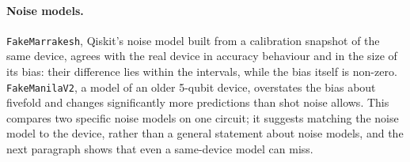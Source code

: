 \documentclass[11pt]{article}
\begin{document}
\begin{table}[h]
\centering
\small
{}
\caption{Hardware study, 200 inputs per task, 1{,}024 shots. ``Changed / expected'' counts predictions that differ from the noise-free prediction, against the exact shot-noise expectation; $p = P(\text{total} \ge \text{observed})$ under shot noise alone. Bias intervals are 95\% bootstraps over inputs (over runs and inputs for the three CVE runs); per-run values are in the text.}
\label{tab:hw}
\end{table}

\paragraph{Noise models.} \texttt{FakeMarrakesh}, Qiskit's noise model built from a calibration snapshot of the same device, agrees with the real device in accuracy behaviour and in the size of its bias: their difference lies within the intervals, while the bias itself is non-zero. \texttt{FakeManilaV2}, a model of an older 5-qubit device, overstates the bias about fivefold and changes significantly more predictions than shot noise allows. This compares two specific noise models on one circuit; it suggests matching the noise model to the device, rather than a general statement about noise models, and the next paragraph shows that even a same-device model can miss.
\end{document}
